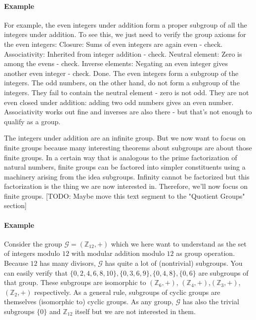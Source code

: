
\paragraph{Example}
For example, the even integers under addition form a proper subgroup of all the integers under addition. To see this, we just need to verify the group axioms for the even integers: Closure: Sums of even integers are again even - check. Associativity: Inherited from integer addition - check. Neutral element: Zero is among the evens - check. Inverse elements: Negating an even integer gives another even integer - check. Done. The even integers form a subgroup of the integers. The odd numbers, on the other hand, do not form a subgroup of the integers. They fail to contain the neutral element - zero is not odd. They are not even closed under addition: adding two odd numbers gives an even number. Associativity works out fine and inverses are also there - but that's not enough to qualify as a group. 

\medskip
The integers under addition are an infinite group. But we now want to focus on finite groups because many interesting theorems about subgroups are about those finite groups. In a certain way that is analogous to the prime factorization of natural numbers, finite groups can be factored into simpler constituents using a machinery arising from the idea subgroups. Infinity cannot be factorized but this factorization is the thing we are now interested in. Therefore, we'll now focus on finite groups. [TODO: Maybe move this text segment to the "Quotient Groups" section]

\paragraph{Example}
Consider the group $\mathcal{G} = (\mathbb{Z}_{12}, +)$ which we here want to understand as the set of integers modulo $12$ with modular addition modulo $12$ as group operation. Because $12$ has many divisors, $\mathcal{G}$ has quite a lot of (nontrivial) subgroups. You can easily verify that $\{0,2,4,6,8,10\}, \{0,3,6,9\}, \{0,4,8\}, \{0,6\}$ are subgroups of that group. These subgroups are isomorphic to $(\mathbb{Z}_{6}, +)$, $(\mathbb{Z}_{4}, +)$,$(\mathbb{Z}_{3}, +)$, $(\mathbb{Z}_{2}, +)$ respectively. As a general rule, subgroups of cyclic groups are themselves (isomorphic to) cyclic groups. As any group, $\mathcal{G}$ has also the trivial subgroups $\{ 0 \}$ and $\mathbb{Z}_{12}$ itself but we are not interested in them. 

